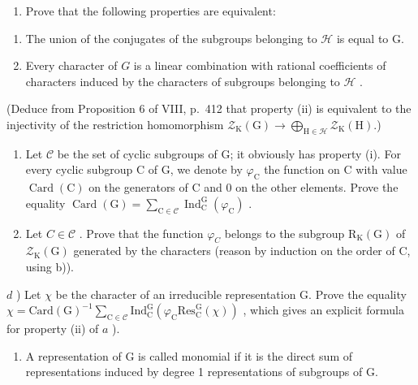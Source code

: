 \begin{enumerate}
\def\labelenumi{\alph{enumi})}
\tightlist
\item
  Prove that the following properties are equivalent:
\end{enumerate}

\begin{enumerate}
\def\labelenumi{(\roman{enumi})}
\item
  The union of the conjugates of the subgroups belonging to \(\mathcal{H}\) is equal to G.
\item
  Every character of \(G\) is a linear combination with rational coefficients of characters induced by the characters of subgroups belonging to \(\mathcal{H}\) .
\end{enumerate}

(Deduce from Proposition 6 of VIII, p.~412 that property (ii) is equivalent to the injectivity of the restriction homomorphism \(\mathcal{Z}_{\mathrm{K}}(\mathrm{G})\to \bigoplus_{\mathrm{H}\in \mathcal{H}}\mathcal{Z}_{\mathrm{K}}(\mathrm{H}).\))

\begin{enumerate}
\def\labelenumi{\alph{enumi})}
\setcounter{enumi}{1}
\item
  Let \(\mathcal{C}\) be the set of cyclic subgroups of G; it obviously has property (i). For every cyclic subgroup C of G, we denote by \(\varphi_{\mathrm{C}}\) the function on C with value \(\operatorname{Card}(\mathrm{C})\) on the generators of C and 0 on the other elements. Prove the equality \(\operatorname{Card}(\mathrm{G}) = \sum_{\mathrm{C} \in \mathcal{C}} \operatorname{Ind}_{\mathrm{C}}^{\mathrm{G}}(\varphi_{\mathrm{C}})\) .
\item
  Let \(C \in \mathcal{C}\) . Prove that the function \(\varphi_{C}\) belongs to the subgroup \(\mathrm{R}_{\mathrm{K}}(\mathrm{G})\) of \(\mathcal{Z}_{\mathrm{K}}(\mathrm{G})\) generated by the characters (reason by induction on the order of C, using b)).
\end{enumerate}

\(d\) ) Let \(\chi\) be the character of an irreducible representation G. Prove the equality \(\chi = \mathrm{Card}(\mathrm{G})^{-1}\sum_{\mathrm{C}\in \mathcal{C}}\mathrm{Ind}_{\mathrm{C}}^{\mathrm{G}}(\varphi_{\mathrm{C}}\mathrm{Res}_{\mathrm{C}}^{\mathrm{G}}(\chi))\) , which gives an explicit formula for property (ii) of \(a\) ).

\begin{enumerate}
\def\labelenumi{\arabic{enumi})}
\setcounter{enumi}{13}
\tightlist
\item
  A representation of G is called monomial if it is the direct sum of representations induced by degree 1 representations of subgroups of G.
\end{enumerate}

